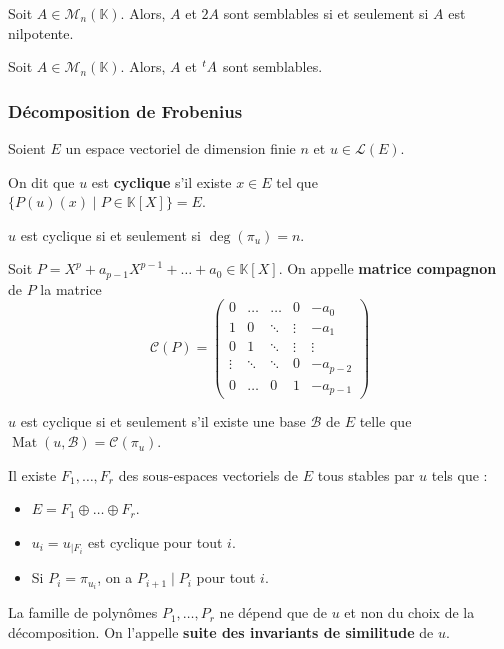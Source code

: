 	\begin{application}
		Soit $A \in \mathcal{M}_n(\mathbb{K})$. Alors, $A$ et $2A$ sont semblables si et seulement si $A$ est nilpotente.
	\end{application}
	
	\begin{application}
		Soit $A \in \mathcal{M}_n(\mathbb{K})$. Alors, $A$ et $\mathstrut ^t A$ sont semblables.
	\end{application}
	
	\subsubsection{Décomposition de Frobenius}
	
	
	Soient $E$ un espace vectoriel de dimension finie $n$ et $u \in \mathcal{L}(E)$.
	
	\begin{definition}
		\label{154-1}
		On dit que $u$ est \textbf{cyclique} s'il existe $x \in E$ tel que $\{ P(u)(x) \mid P \in \mathbb{K}[X] \} = E$.
	\end{definition}
	
	\begin{proposition}
		$u$ est cyclique si et seulement si $\deg(\pi_u) = n$.
	\end{proposition}
	
	\begin{definition}
		Soit $P = X^p + a_{p-1} X^{p-1} + \dots + a_0 \in \mathbb{K}[X]$. On appelle \textbf{matrice compagnon} de $P$ la matrice
		\[ \mathcal{C}(P) = \begin{pmatrix} 0 & \dots & \dots & 0 & -a_0 \\ 1 & 0 & \ddots & \vdots & -a_1 \\ 0 & 1 & \ddots & \vdots & \vdots \\ \vdots & \ddots & \ddots & 0 & -a_{p-2} \\ 0 & \dots & 0 & 1 & -a_{p-1} \end{pmatrix} \]
	\end{definition}
	
	\begin{proposition}
		$u$ est cyclique si et seulement s'il existe une base $\mathcal{B}$ de $E$ telle que $\operatorname{Mat}(u, \mathcal{B}) = \mathcal{C}(\pi_u)$.
	\end{proposition}
	
	\begin{theorem}
		Il existe $F_1, \dots, F_r$ des sous-espaces vectoriels de $E$ tous stables par $u$ tels que :
		\begin{itemize}
			\item $E = F_1 \oplus \dots \oplus F_r$.
			\item $u_i = u_{|F_i}$ est cyclique pour tout $i$.
			\item Si $P_i = \pi_{u_i}$, on a $P_{i+1} \mid P_i$ pour tout $i$.
		\end{itemize}
		La famille de polynômes $P_1, \dots, P_r$ ne dépend que de $u$ et non du choix de la décomposition. On l'appelle \textbf{suite des invariants de similitude} de $u$.
	\end{theorem}
	
